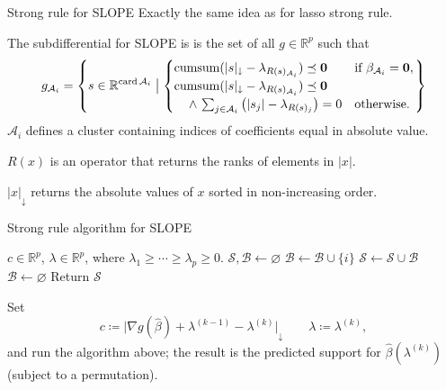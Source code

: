 \documentclass[10pt,ignorenonframetext]{beamer}
\begin{document}
\begin{frame}{Strong rule for SLOPE}
Exactly the same idea as for lasso strong rule.\medskip

The subdifferential for SLOPE is is the
set of all \(g \in \mathbb{R}^p\) such that
\[
g_{\mathcal{A}_i} =
\left\{s \in \mathbb{R}^{\mathop{\mathrm{card}}{\mathcal{A}_i}} \bigm\vert 
\begin{cases}
  \mathop{\mathrm{cumsum}}(|s|_\downarrow - \lambda_{R(s)_{\mathcal{A}_i}}) \preceq \mathbf{0} &\text{if } \beta_{\mathcal{A}_i} = \mathbf{0},\\
  \mathop{\mathrm{cumsum}}(|s|_\downarrow - \lambda_{R(s)_{\mathcal{A}_i}}) \preceq \mathbf{0} \\\quad\,\wedge\, \sum_{j \in \mathcal{A}_i}\left(|s_j| - \lambda_{R(s)_j}\right) = 0 & \text{otherwise.}
\end{cases}
\right\}
\]
\(\mathcal{A}_i\) defines a \alert{cluster} containing indices of coefficients
equal in absolute value.\medskip

\(R(x)\) is an operator that returns the \alert{ranks} of elements in \(|x|\).\medskip

\(|x|_\downarrow\) returns the absolute values of \(x\) sorted in non-increasing
order.\medskip
\end{frame}

\begin{frame}[fragile]{Strong rule algorithm for SLOPE}
\label{alg:sparsity-rule}
\begin{algorithmic}[1]
\Require \(c \in \mathbb{R}^p\), 
         \(\lambda \in \mathbb{R}^p\), where 
         \(\lambda_1 \geq \cdots \geq \lambda_p \geq 0\).
\State \(\mathcal{S}, \mathcal{B} \gets \varnothing\)
  \State \(\mathcal{B} \gets \mathcal{B} \cup \{i\}\)
    \State \(\mathcal{S} \gets \mathcal{S} \cup \mathcal{B}\)
    \State \(\mathcal{B} \gets \varnothing\)
  \EndIf
\EndFor
\State Return \(\mathcal{S}\)
\end{algorithmic}
\medskip
Set
\[
    c \coloneqq \lvert \nabla g(\hat\beta)+ \lambda^{(k-1)} - \lambda^{(k)}\rvert_\downarrow \qquad \lambda \coloneqq \lambda^{(k)},
\] and run the algorithm above;
the result is the predicted support for \(\hat\beta(\lambda^{(k)})\) (subject to a 
permutation).
\end{frame}
\end{document}
